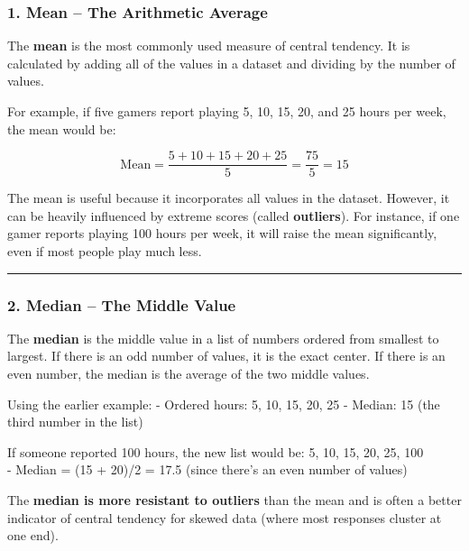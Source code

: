 \documentclass[
]{book}
\begin{document}
\subsubsection*{\texorpdfstring{1. \textbf{Mean} -- The Arithmetic Average}{1. Mean -- The Arithmetic Average}}\label{mean-the-arithmetic-average}

The \textbf{mean} is the most commonly used measure of central tendency. It is calculated by adding all of the values in a dataset and dividing by the number of values.

For example, if five gamers report playing 5, 10, 15, 20, and 25 hours per week, the mean would be:

\[
\text{Mean} = \frac{5 + 10 + 15 + 20 + 25}{5} = \frac{75}{5} = 15
\]

The mean is useful because it incorporates all values in the dataset. However, it can be heavily influenced by extreme scores (called \textbf{outliers}). For instance, if one gamer reports playing 100 hours per week, it will raise the mean significantly, even if most people play much less.

\begin{center}\rule{0.5\linewidth}{0.5pt}\end{center}

\subsubsection*{\texorpdfstring{2. \textbf{Median} -- The Middle Value}{2. Median -- The Middle Value}}\label{median-the-middle-value}

The \textbf{median} is the middle value in a list of numbers ordered from smallest to largest. If there is an odd number of values, it is the exact center. If there is an even number, the median is the average of the two middle values.

Using the earlier example: - Ordered hours: 5, 10, 15, 20, 25 - Median: 15 (the third number in the list)

If someone reported 100 hours, the new list would be: 5, 10, 15, 20, 25, 100\\
- Median = (15 + 20)/2 = 17.5 (since there's an even number of values)

The \textbf{median is more resistant to outliers} than the mean and is often a better indicator of central tendency for skewed data (where most responses cluster at one end).
\end{document}
